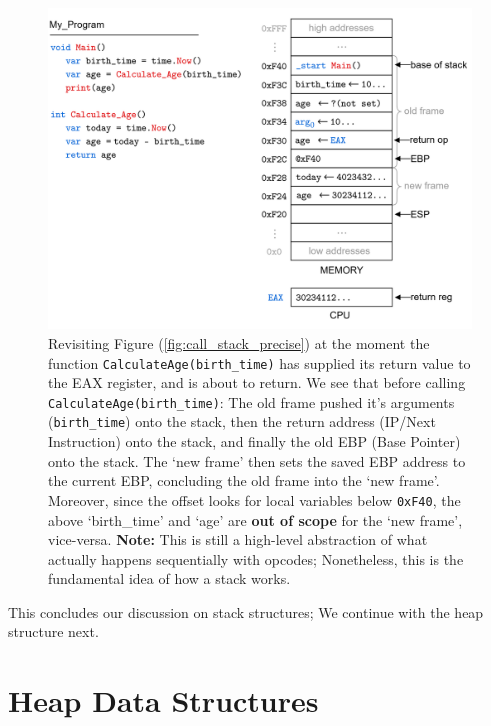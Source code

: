 \begin{figure}[!ht]
    \centering
    \includegraphics[width=\textwidth]{./Sections/stacks_heaps/call_stack_after.png}
    \caption{Revisiting Figure (\ref{fig:call_stack_precise}) at the moment the function \texttt{CalculateAge(birth\_time)} has supplied its return value to the EAX register, and is about to return.
    We see that before calling \texttt{CalculateAge(birth\_time)}: The old frame pushed it's arguments (\texttt{birth\_time}) onto the stack, then the return address (IP/Next Instruction) onto the stack,
    and finally the old EBP (Base Pointer) onto the stack. The `new frame' then sets the saved EBP address to the current EBP, concluding the old frame into the `new frame'. Moreover, since the offset
    looks for local variables below \texttt{0xF40}, the above `birth\_time' and `age' are \textbf{out of scope} for the `new frame', vice-versa. \textbf{Note:} This is 
    still a high-level abstraction of what actually happens sequentially with opcodes; Nonetheless, this is the fundamental idea of how a stack works. }
    \label{fig:call_stack_after}
\end{figure}

\noindent 
This concludes our discussion on stack structures; We continue with the heap structure next.

\newpage 

\noindent
\section{Heap Data Structures}
\label{sec:heap}

